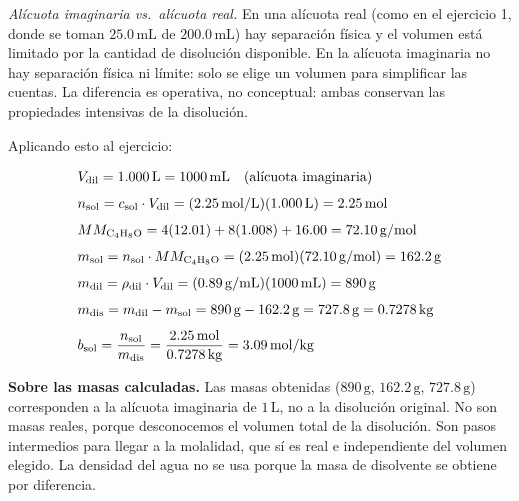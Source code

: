 \begin{exercise}{}{}
\begin{notaimportante}
\textit{Alícuota imaginaria vs.\ alícuota real.} En una alícuota real (como en 
el ejercicio 1, donde se toman $25.0\,\mathrm{mL}$ de $200.0\,\mathrm{mL}$) hay 
separación física y el volumen está limitado por la cantidad de disolución 
disponible. En la alícuota imaginaria no hay separación física ni límite: solo 
se elige un volumen para simplificar las cuentas. La diferencia es operativa, 
no conceptual: ambas conservan las propiedades intensivas de la disolución.
\end{notaimportante}

Aplicando esto al ejercicio:

\begin{align*}
    &V_{\mathrm{dil}} = 1.000\,\mathrm{L} = 1000\,\mathrm{mL} 
        \quad \text{(alícuota imaginaria)} \\[4pt]
    &n_{\mathrm{sol}} = c_{\mathrm{sol}} \cdot V_{\mathrm{dil}}
        = (2.25\,\mathrm{mol/L})(1.000\,\mathrm{L})
        = 2.25\,\mathrm{mol} \\[4pt]
    &MM_{\ce{C4H8O}} = 4(12.01) + 8(1.008) + 16.00 = 72.10\,\mathrm{g/mol} \\[4pt]
    &m_{\mathrm{sol}} = n_{\mathrm{sol}} \cdot MM_{\ce{C4H8O}}
        = (2.25\,\mathrm{mol})(72.10\,\mathrm{g/mol})
        = 162.2\,\mathrm{g} \\[4pt]
    &m_{\mathrm{dil}} = \rho_{\mathrm{dil}} \cdot V_{\mathrm{dil}}
        = (0.89\,\mathrm{g/mL})(1000\,\mathrm{mL})
        = 890\,\mathrm{g} \\[4pt]
    &m_{\mathrm{dis}} = m_{\mathrm{dil}} - m_{\mathrm{sol}}
        = 890\,\mathrm{g} - 162.2\,\mathrm{g}
        = 727.8\,\mathrm{g} = 0.7278\,\mathrm{kg} \\[4pt]
    &b_{\mathrm{sol}} = \frac{n_{\mathrm{sol}}}{m_{\mathrm{dis}}}
        = \frac{2.25\,\mathrm{mol}}{0.7278\,\mathrm{kg}}
        = 3.09\,\mathrm{mol/kg}
\end{align*}

\begin{notaimportante}
\textbf{Sobre las masas calculadas.} Las masas obtenidas 
($890\,\mathrm{g}$, $162.2\,\mathrm{g}$, $727.8\,\mathrm{g}$) corresponden a la 
alícuota imaginaria de $1\,\mathrm{L}$, no a la disolución original. No son 
masas reales, porque desconocemos el volumen total de la disolución. Son pasos 
intermedios para llegar a la molalidad, que sí es real e independiente del 
volumen elegido. La densidad del agua no se usa porque la masa de disolvente se 
obtiene por diferencia.
\end{notaimportante}
\end{exercise}

